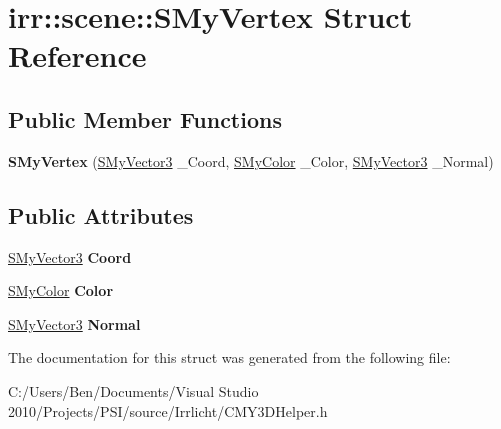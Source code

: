 \hypertarget{structirr_1_1scene_1_1_s_my_vertex}{\section{irr\-:\-:scene\-:\-:S\-My\-Vertex Struct Reference}
\label{structirr_1_1scene_1_1_s_my_vertex}
}
\subsection*{Public Member Functions}
\begin{DoxyCompactItemize}
\item 
\hypertarget{structirr_1_1scene_1_1_s_my_vertex_a489909cdba4c47b4125c8b5170dc1125}{{\bfseries S\-My\-Vertex} (\hyperlink{structirr_1_1scene_1_1_s_my_vector3}{S\-My\-Vector3} \-\_\-\-Coord, \hyperlink{structirr_1_1scene_1_1_s_my_color}{S\-My\-Color} \-\_\-\-Color, \hyperlink{structirr_1_1scene_1_1_s_my_vector3}{S\-My\-Vector3} \-\_\-\-Normal)}\label{structirr_1_1scene_1_1_s_my_vertex_a489909cdba4c47b4125c8b5170dc1125}

\end{DoxyCompactItemize}
\subsection*{Public Attributes}
\begin{DoxyCompactItemize}
\item 
\hypertarget{structirr_1_1scene_1_1_s_my_vertex_a1131b6e965bf7e15b5922e71efa3f5b1}{\hyperlink{structirr_1_1scene_1_1_s_my_vector3}{S\-My\-Vector3} {\bfseries Coord}}\label{structirr_1_1scene_1_1_s_my_vertex_a1131b6e965bf7e15b5922e71efa3f5b1}

\item 
\hypertarget{structirr_1_1scene_1_1_s_my_vertex_a51310927bed4c6f25fa2f3f132c3b78c}{\hyperlink{structirr_1_1scene_1_1_s_my_color}{S\-My\-Color} {\bfseries Color}}\label{structirr_1_1scene_1_1_s_my_vertex_a51310927bed4c6f25fa2f3f132c3b78c}

\item 
\hypertarget{structirr_1_1scene_1_1_s_my_vertex_a6046a1e1c5a278f748ea2ef051ee4e8d}{\hyperlink{structirr_1_1scene_1_1_s_my_vector3}{S\-My\-Vector3} {\bfseries Normal}}\label{structirr_1_1scene_1_1_s_my_vertex_a6046a1e1c5a278f748ea2ef051ee4e8d}

\end{DoxyCompactItemize}


The documentation for this struct was generated from the following file\-:\begin{DoxyCompactItemize}
\item 
C\-:/\-Users/\-Ben/\-Documents/\-Visual Studio 2010/\-Projects/\-P\-S\-I/source/\-Irrlicht/C\-M\-Y3\-D\-Helper.\-h\end{DoxyCompactItemize}
